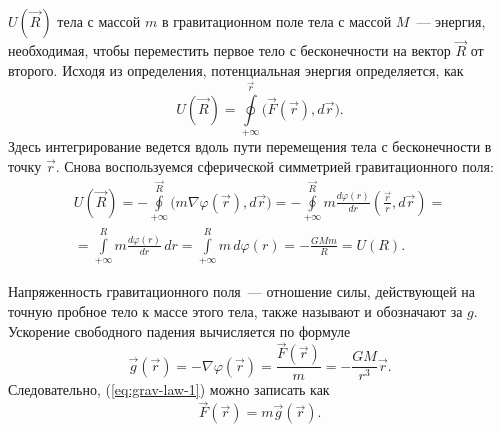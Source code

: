  $U(\vec{R})$ тела с массой $m$ в гравитационном поле тела с массой $M$~--- энергия, необходимая, чтобы переместить первое тело с бесконечности на вектор $\vec{R}$ от второго. Исходя из определения, потенциальная энергия определяется, как
\begin{equation}
    U(\vec R) =  \oint\limits_{+\infty}^\vec{r} \big(\vec F( \vec r),d \vec r\big).
\end{equation}
Здесь интегрирование ведется вдоль пути перемещения тела с бесконечности в точку $\vec{r}$. Снова воспользуемся сферической симметрией гравитационного поля:
\begin{multline}
    U(\vec R) 
    = - \oint\limits_{+\infty}^\vec{R} \big(m \nabla \varphi (\vec{r}), d \vec r\big)
    = - \oint\limits_{+\infty}^\vec{R} m \frac{d \varphi(r)}{d r} \left( \frac{\vec r}{r}, d \vec r \right) = \\
    = \int\limits_{+\infty}^R m \frac{d \varphi(r)}{d r} \,d r 
    = \int\limits_{+\infty}^R m \, d \varphi(r) = -\frac{GMm}{R} = U(R).
\end{multline}

Напряженность гравитационного поля~--- отношение силы, действующей на точную пробное тело к массе этого тела, также называют  и обозначают за $g$. Ускорение свободного падения вычисляется по формуле
\begin{equation}
	\vec g(\vec r) = -\nabla \varphi(\vec r) = \frac{\vec F( \vec r)}{m} = - \frac{GM}{r^3} \vec r.
	\label{eq:g}
\end{equation} 
Следовательно, (\ref{eq:grav-law-1}) можно записать как
\begin{equation}
	\vec F (\vec r) = m \vec g(\vec r).
\end{equation}
